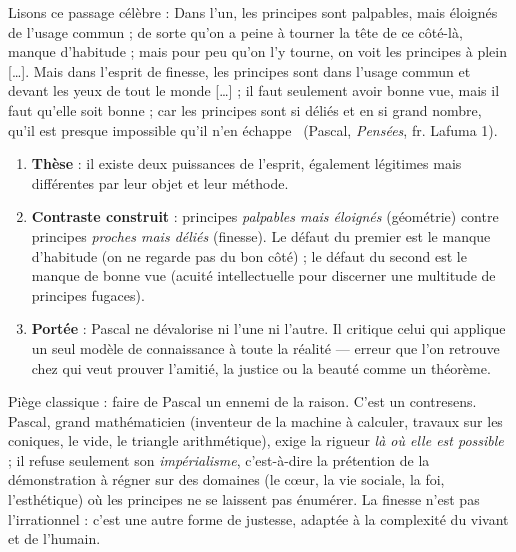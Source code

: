 \documentclass[11pt]{article}
\begin{document}
\begin{experience}
Lisons ce passage célèbre : \guillemotleft Dans l'un, les principes sont palpables, mais éloignés de l'usage commun ; de sorte qu'on a peine à tourner la tête de ce côté-là, manque d'habitude ; mais pour peu qu'on l'y tourne, on voit les principes à plein [\ldots]. Mais dans l'esprit de finesse, les principes sont dans l'usage commun et devant les yeux de tout le monde [\ldots] ; il faut seulement avoir bonne vue, mais il faut qu'elle soit bonne ; car les principes sont si déliés et en si grand nombre, qu'il est presque impossible qu'il n'en échappe \guillemotright\ (Pascal, \emph{Pensées}, fr. Lafuma 1).
\begin{enumerate}
\item \textbf{Thèse} : il existe deux puissances de l'esprit, également légitimes mais différentes par leur objet et leur méthode.
\item \textbf{Contraste construit} : principes \emph{palpables mais éloignés} (géométrie) contre principes \emph{proches mais déliés} (finesse). Le défaut du premier est le manque d'habitude (on ne regarde pas du bon côté) ; le défaut du second est le manque de \guillemotleft bonne vue \guillemotright (acuité intellectuelle pour discerner une multitude de principes fugaces).
\item \textbf{Portée} : Pascal ne dévalorise ni l'une ni l'autre. Il critique celui qui applique un seul modèle de connaissance à toute la réalité — erreur que l'on retrouve chez qui veut \guillemotleft prouver \guillemotright l'amitié, la justice ou la beauté comme un théorème.
\end{enumerate}
\end{experience}

\begin{attention}
Piège classique : faire de Pascal un ennemi de la raison. C'est un contresens. Pascal, grand mathématicien (inventeur de la machine à calculer, travaux sur les coniques, le vide, le triangle arithmétique), exige la rigueur \emph{là où elle est possible} ; il refuse seulement son \emph{impérialisme}, c'est-à-dire la prétention de la démonstration à régner sur des domaines (le cœur, la vie sociale, la foi, l'esthétique) où les principes ne se laissent pas énumérer. La finesse n'est pas l'irrationnel : c'est une autre forme de justesse, adaptée à la complexité du vivant et de l'humain.
\end{attention}
\end{document}
